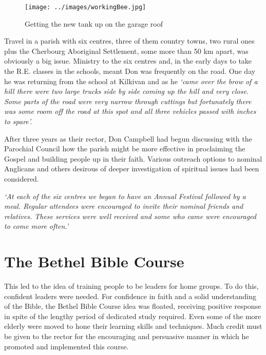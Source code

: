 \begin{figure}
\begin{center}
\texttt{[image: ../images/workingBee.jpg]}
\caption{Getting the new tank up on the garage roof}
\end{center}
\end{figure}




Travel in a parish with six centres, three of them country towns, two rural ones plus the Cherbourg Aboriginal Settlement, some more than 50 km apart, was obviously a big issue. Ministry to the six centres and, in the early days to take the R.E. classes in the schools, meant Don was frequently on the road. One day he was returning from the school at Kilkivan and as he \emph{`came over the brow of a hill there were two large trucks side by side coming up the hill and very close. Some parts of the road were very narrow through cuttings but fortunately there was some room off the road at this spot and all three vehicles passed with inches to spare'.}



After three years as their rector, Don Campbell had begun discussing with the Parochial Council how the parish might be more effective in proclaiming the Gospel and building people up in their faith. Various outreach options to nominal Anglicans and others desirous of deeper investigation of spiritual issues had been considered.



\emph{`At each of the six centres we began to have an Annual Festival followed by a meal. Regular attendees were encouraged to invite their nominal friends and relatives. These services were well received and some who came were encouraged to come more often.'}



\section{The Bethel Bible Course}



This led to the idea of training people to be leaders for home groups. To do this, confident leaders were needed. For confidence in faith and a solid understanding of the Bible, the Bethel Bible Course idea was floated, receiving positive response in spite of the lengthy period of dedicated study required. Even some of the more elderly were moved to hone their learning skills and techniques. Much credit must be given to the rector for the encouraging and persuasive manner in which he promoted and implemented this course.



